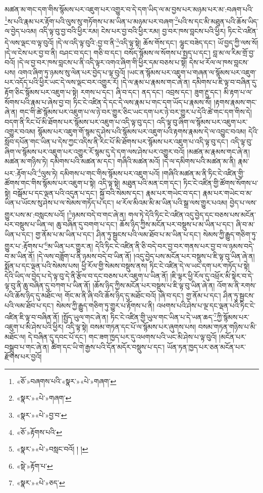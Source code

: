 མཚན་མ་གང་དག་གིས་སྙོམས་པར་འཇུག་པར་འགྱུར་བ་དེ་དག་ཡིད་ལ་མ་བྱས་པར་མཉམ་པར་མ་:བཞག་པའི་\footnote{«ཅོ་»བཞགས་པའི་«སྣར་»«པེ་»གཞག་}ས་པའི་རྣམ་པར་རྟོག་པའི་ལུས་སུ་གཏོགས་པ་མ་ཡིན་པ་མཉམ་པར་བཞག་\footnote{«སྣར་»«པེ་»གཞག་}པའི་ས་དང་མི་མཐུན་པའི་ཆོས་ཡིད་ལ་བྱེད་པའམ། འདི་ལྟ་བུ་བྱ་བའི་ཕྱིར་རམ། ངེས་པར་བྱ་བའི་ཕྱིར་རམ། བྱ་བར་ཁས་བླངས་པའི་ཕྱིར། ཏིང་ངེ་འཛིན་དེ་ལས་ལྡང་བ་ལྟ་བུའོ། །དེ་ལ་འདི་ལྟ་བུའི་:བྱ་བ་ནི་\footnote{«སྣར་»«པེ་»བྱ་བ་}འདི་ལྟ་སྟེ། ཆོས་གོས་དང་། ལྷུང་བཟེད་དང་། ཡོ་བྱད་ཀྱི་ལས་སོ། །དེ་ལ་ངེས་པར་བྱ་བ་ནི། བཤང་བ་དང་། གཅི་བ་དང་། བསོད་སྙོམས་ལ་སོགས་པ་སྤྱད་པ་དང་། བླ་མ་ལ་རིམ་གྲོ་བྱ་བའོ། །དེ་ལ་བྱ་བར་ཁས་བླངས་པ་ནི་འདི་ལྟར་འགའ་ཞིག་གི་ཕྱིར་དམ་བཅས་པ་སྟེ། དེས་ཕ་རོལ་ལ་ཁས་བླངས་པས། འགའ་ཞིག་ཏུ་ཉམས་སུ་ལེན་པར་བྱེད་པ་ལྟ་བུའོ། །ཡང་ན་སྙོམས་པར་འཇུག་པ་གཞན་ལ་སྙོམས་པར་འཇུག་པར་འདོད་པའི་ཕྱིར་ཡང་དེ་ལས་ལྡང་བར་འགྱུར་རོ། །དེ་ལ་རྣམ་པ་རྣམས་གང་ཞེ་ན། དམིགས་པ་ཇི་ལྟ་བ་བཞིན་དུ་རྟོག་ཅིང་སྙོམས་པར་འཇུག་པ་སྟེ། རགས་པ་དང་། ཞི་བ་དང་། ནད་དང་། འབྲས་དང་། ཟུག་རྔུ་དང་། མི་རྟག་པ་ལ་སོགས་པའི་རྣམ་པ་ཞེས་བྱ་བ། ཏིང་ངེ་འཛིན་དེ་དང་དེ་ལས་རྣམ་པ་གང་དག་ཡོད་པ་རྣམས་སོ། །རྟགས་རྣམས་གང་ཞེ་ན། གང་གི་ཚེ་སྙོམས་པར་འཇུག་པ་ལ་ཉེ་བར་གྱུར་ཅིང་ཡང་དག་པར་ཉེ་བར་གྱུར་པ་དེའི་ཚེ་གང་དག་གིས་དེ། བདག་ནི་རིང་པོ་མི་ཐོགས་པར་སྙོམས་པར་འཇུག་པ་འདི་ལྟ་བུ་དང་། འདི་ལྟ་བུ་ཞིག་ལ་སྙོམས་པར་འཇུག་པར་འགྱུར་བའམ། སྙོམས་པར་འཇུག་གོ་སྙམ་དུ་ཤེས་པའི་སྙོམས་པར་འཇུག་པའི་རྟགས་རྣམས་དེ་ལ་འབྱུང་བའམ། དེའི་སློབ་དཔོན་གང་ཡིན་པ་དེས་ཀྱང་འདིས་ནི་རིང་པོ་མི་ཐོགས་པར་སྙོམས་པར་འཇུག་པ་འདི་ལྟ་བུ་དང་། འདི་ལྟ་བུ་ཞིག་ལ་སྙོམས་པར་འཇུག་པར་འགྱུར་རོ་སྙམ་དུ་དེ་དག་ལས་ཤེས་པར་འགྱུར་བའོ། །མཚན་མ་རྣམས་གང་ཞེ་ན། མཚན་མ་གཉིས་ཏེ། དམིགས་པའི་མཚན་མ་དང་། གཞིའི་མཚན་མའོ། །དེ་ལ་དམིགས་པའི་མཚན་མ་ནི། རྣམ་པར་:རྟོག་པའི་\footnote{«ཅོ་»རྟོགས་པའི་}ལུས་ཏེ། དམིགས་པ་གང་གིས་སྙོམས་པར་འཇུག་པའོ། །གཞིའི་མཚན་མ་ནི་ཏིང་ངེ་འཛིན་གྱི་ཚོགས་གང་གིས་སྙོམས་པར་འཇུག་པ་སྟེ། འདི་ལྟ་སྟེ། མཐུན་པའི་མན་ངག་དང་། ཏིང་ངེ་འཛིན་གྱི་ཚོགས་སོགས་པ་སྟེ། བསྒོམ་པ་དང་ལྡན་པའི་འདུན་པ་དང་། སྐྱོ་བའི་སེམས་དང་། རྣམ་པར་གཡེང་བ་དང་། རྣམ་པར་གཡེང་བ་མ་ཡིན་པ་ཡོངས་སུ་ཤེས་པ་ལ་སེམས་གཏོད་པ་དང་། ཕ་རོལ་མིའམ་མི་མ་ཡིན་པའི་སྒྲ་ལས་གྱུར་པའམ། བྱེད་པ་ལས་གྱུར་པས་མ་:བསླངས་པའོ། །\footnote{«སྣར་»«པེ་»བསླང་བའོ། ། །}ཉམས་བདེ་བ་གང་ཞེ་ན། གལ་ཏེ་དེའི་ཏིང་ངེ་འཛིན་འདུ་བྱེད་དང་བཅས་པས་མངོན་པར་བསྡུས་པ་ཡིན་ལ། ཆུ་བཞིན་དུ་བགག་པ་དང་། ཆོས་ཉིད་ཀྱིས་མངོན་པར་བསྡུས་པ་མ་ཡིན་པ་དང་། ཞི་བ་མ་ཡིན་པ་དང་། གྱ་ནོམ་པ་མ་ཡིན་པ་དང་། ཤིན་ཏུ་སྦྱངས་པའི་ལམ་ཐོབ་པ་མ་ཡིན་པ་དང་། སེམས་ཀྱི་རྒྱུད་གཅིག་ཏུ་གྱུར་པ་:རྟོགས་པ་\footnote{«སྡེ་»རྟོག་པ་}མ་ཡིན་པར་གྱུར་ན། དེའི་ཏིང་ངེ་འཛིན་ནི་ཅི་བདེ་བར་བྱ་བར་གནས་པར་བྱ་བ་ལ་ཉམས་བདེ་བ་མ་ཡིན་ནོ། །དེ་ལས་བཟློག་པ་ནི་ཉམས་བདེ་བ་ཡིན་ནོ། །འདུ་བྱེད་པས་མངོན་པར་བསྡུས་པ་ཇི་ལྟ་བུ་ཡིན་ཞེ་ན། སྨོན་པ་དང་ལྡན་པའི་སེམས་པས། ཕྱི་རོལ་གྱི་སེམས་བསྡུས་ནས། ཏིང་ངེ་འཛིན་དེ་ལ་ཡང་དག་པར་གཏོད་པ་སྟེ། དེའི་ཡིད་ལ་བྱེད་པ་དེ་ལྟ་བུ་དེ་ནི་རྩོལ་བ་དང་བཅས་པར་འཇུག་པ་ཡིན་ནོ། །ཇི་ལྟར་ཕྱི་རོལ་དུ་འཕྲོར་མི་སྟེར་བ་དེ་ལྟ་བུ་ནི་ཆུ་བཞིན་དུ་བཀག་པ་ཡིན་ནོ། །ཆོས་ཉིད་ཀྱིས་མངོན་པར་བསྡུས་པ་ཇི་ལྟ་བུ་ཡིན་ཞེ་ན། འོག་མ་ནི་རགས་པའི་ཆོས་ཉིད་དུ་མཐོང་ལ། གོང་མ་ནི་ཞི་བའི་ཆོས་ཉིད་དུ་མཐོང་བའོ། །ཞི་བ་དང་། གྱ་ནོམ་པ་དང་། ཤིན་ཏུ་སྦྱངས་པའི་ལམ་ཐོབ་པ་དང་། སེམས་ཀྱི་རྒྱུད་གཅིག་ཏུ་གྱུར་པ་རྟོགས་པ་ནི། འཕགས་པའི་ཤེས་པ་ལྔ་དང་ལྡན་པའི་ཏིང་ངེ་འཛིན་ཇི་ལྟ་བ་བཞིན་ནོ། །སྤྱོད་ཡུལ་གང་ཞེ་ན། ཏིང་ངེ་འཛིན་གྱི་ཡུལ་གང་ཡིན་པ་དེ་ཡན་ཆད་\footnote{«སྣར་»«པེ་»ཅད་}ཀྱི་སྙོམས་པར་འཇུག་པ་མི་ཤེས་པའི་ཕྱིར། འདི་ལྟ་སྟེ། བསམ་གཏན་དང་པོ་ལ་སྙོམས་པར་ཞུགས་པས། བསམ་གཏན་གཉིས་པ་མི་མཐོང་ལ། དེ་བཞིན་དུ་དབང་པོ་དང་། གང་ཟག་ཁྱད་པར་དུ་འཕགས་པའི་ཡང་མི་ཤེས་པ་ལྟ་བུའོ། །མངོན་པར་བསྒྲུབ་པ་གང་ཞེ་ན། ཚིག་དང་ཡི་གེ་རྒྱས་པའི་དོན་མདོར་བསྡུས་པ་དང་། ཡོན་ཏན་ཁྱད་པར་ཅན་མངོན་པར་རྫོགས་པར་བྱའོ། 